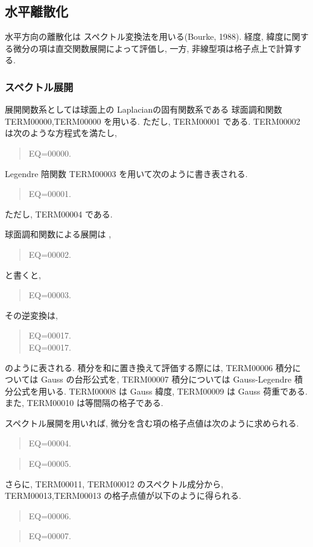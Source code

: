 ﻿\subsection{水平離散化}

水平方向の離散化は
スペクトル変換法を用いる(Bourke, 1988).
経度, 緯度に関する微分の項は直交関数展開によって評価し,
一方, 非線型項は格子点上で計算する.

\subsubsection{スペクトル展開}

展開関数系としては球面上の Laplacianの固有関数系である
球面調和関数 TERM00000,TERM00000 を用いる.
ただし, TERM00001 である.
TERM00002 は次のような方程式を満たし,
%
\begin{quote}
EQ=00000.
\end{quote}
%
Legendre 陪関数 TERM00003 を用いて次のように書き表される.
%
\begin{quote}
EQ=00001.
\end{quote}
%
ただし, TERM00004 である.

球面調和関数による展開は \footnotemark ,
\begin{quote}
EQ=00002.
\end{quote}
と書くと,
%
%
\begin{quote}
EQ=00003.
\label{球面展開}
\end{quote}
%
その逆変換は,
\begin{quote}
EQ=00017.\\
\label{展開係数}
EQ=00017.
\end{quote}
%
のように表される.
%
積分を和に置き換えて評価する際には,
TERM00006 積分については Gauss の台形公式を,
TERM00007 積分については Gauss-Legendre 積分公式を用いる.
TERM00008 は Gauss 緯度, TERM00009 は Gauss 荷重である.
また, TERM00010 は等間隔の格子である.

スペクトル展開を用いれば,
微分を含む項の格子点値は次のように求められる.
%
\begin{quote}
EQ=00004.
\label{気圧x}
\end{quote}
%
\begin{quote}
EQ=00005.
\label{気圧y}
\end{quote}
%
さらに,
TERM00011, TERM00012 のスペクトル成分から, 
TERM00013,TERM00013 の格子点値が以下のように得られる.
%
\begin{quote}
EQ=00006.
\label{Uを求める}
\end{quote}
%
\begin{quote}
EQ=00007.
\label{Vを求める}
\end{quote}

